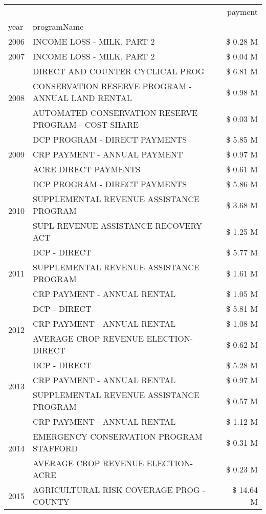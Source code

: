 \begin{tabular}{llr}
\toprule
 &  & payment \\
year & programName &  \\
\midrule
2006 & INCOME LOSS - MILK, PART 2 & \$ 0.28 M \\
\cline{1-3}
2007 & INCOME LOSS - MILK, PART 2 & \$ 0.04 M \\
\cline{1-3}
\multirow[t]{3}{*}{2008} & DIRECT AND COUNTER CYCLICAL PROG & \$ 6.81 M \\
 & CONSERVATION RESERVE PROGRAM - ANNUAL LAND RENTAL & \$ 0.98 M \\
 & AUTOMATED CONSERVATION RESERVE PROGRAM - COST SHARE & \$ 0.03 M \\
\cline{1-3}
\multirow[t]{3}{*}{2009} & DCP PROGRAM - DIRECT PAYMENTS & \$ 5.85 M \\
 & CRP PAYMENT - ANNUAL PAYMENT & \$ 0.97 M \\
 & ACRE DIRECT PAYMENTS & \$ 0.61 M \\
\cline{1-3}
\multirow[t]{3}{*}{2010} & DCP PROGRAM - DIRECT PAYMENTS & \$ 5.86 M \\
 & SUPPLEMENTAL REVENUE ASSISTANCE PROGRAM & \$ 3.68 M \\
 & SUPL REVENUE ASSISTANCE RECOVERY ACT & \$ 1.25 M \\
\cline{1-3}
\multirow[t]{3}{*}{2011} & DCP - DIRECT & \$ 5.77 M \\
 & SUPPLEMENTAL REVENUE ASSISTANCE PROGRAM & \$ 1.61 M \\
 & CRP PAYMENT - ANNUAL RENTAL & \$ 1.05 M \\
\cline{1-3}
\multirow[t]{3}{*}{2012} & DCP - DIRECT & \$ 5.81 M \\
 & CRP PAYMENT - ANNUAL RENTAL & \$ 1.08 M \\
 & AVERAGE CROP REVENUE ELECTION-DIRECT & \$ 0.62 M \\
\cline{1-3}
\multirow[t]{3}{*}{2013} & DCP - DIRECT & \$ 5.28 M \\
 & CRP PAYMENT - ANNUAL RENTAL & \$ 0.97 M \\
 & SUPPLEMENTAL REVENUE ASSISTANCE PROGRAM & \$ 0.57 M \\
\cline{1-3}
\multirow[t]{3}{*}{2014} & CRP PAYMENT - ANNUAL RENTAL & \$ 1.12 M \\
 & EMERGENCY CONSERVATION PROGRAM STAFFORD & \$ 0.31 M \\
 & AVERAGE CROP REVENUE ELECTION-ACRE & \$ 0.23 M \\
\cline{1-3}
\multirow[t]{3}{*}{2015} & AGRICULTURAL RISK COVERAGE PROG - COUNTY & \$ 14.64 M \\

\end{tabular}
